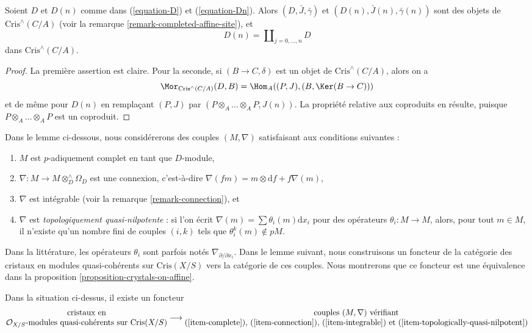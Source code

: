 \begin{lemma}
\label{lemma-property-Dn}
Soient $D$ et $D(n)$ comme dans (\ref{equation-D}) et (\ref{equation-Dn}).
Alors $(D, \bar J, \bar\gamma)$ et $(D(n), \bar J(n), \bar\gamma(n))$
sont des objets de $\text{Cris}^\wedge(C/A)$ (voir la
remarque \ref{remark-completed-affine-site}), et
$$
D(n) = \coprod\nolimits_{j = 0, \ldots, n} D
$$
dans $\text{Cris}^\wedge(C/A)$.
\end{lemma}

\begin{proof}
La première assertion est claire. Pour la seconde, si $(B \to C, \delta)$ est un
objet de $\text{Cris}^\wedge(C/A)$, alors on a
$$
\Mor_{\text{Cris}^\wedge(C/A)}(D, B) = 
\Hom_A((P, J), (B, \Ker(B \to C)))
$$
et de même pour $D(n)$ en remplaçant $(P, J)$ par
$(P \otimes_A \ldots \otimes_A P, J(n))$. La propriété relative aux coproduits en résulte,
puisque $P \otimes_A \ldots \otimes_A P$ est un coproduit.
\end{proof}

\noindent
Dans le lemme ci-dessous, nous considérerons des couples $(M, \nabla)$ satisfaisant aux
conditions suivantes :
\begin{enumerate}
\item
\label{item-complete}
$M$ est $p$-adiquement complet en tant que $D$-module,
\item
\label{item-connection}
$\nabla : M \to M \otimes^\wedge_D \Omega_D$ est une connexion, c'est-à-dire
$\nabla(fm) = m \otimes \text{d}f + f\nabla(m)$,
\item
\label{item-integrable}
$\nabla$ est intégrable
(voir la remarque \ref{remark-connection}), et
\item
\label{item-topologically-quasi-nilpotent}
$\nabla$ est {\it topologiquement quasi-nilpotente} : si l'on écrit
$\nabla(m) = \sum \theta_i(m)\text{d}x_i$ pour des opérateurs
$\theta_i : M \to M$, alors, pour tout $m \in M$, il n'existe qu'un nombre fini
de couples $(i, k)$ tels que $\theta_i^k(m) \not \in pM$.
\end{enumerate}
Dans la littérature, les opérateurs $\theta_i$ sont parfois notés
$\nabla_{\partial/\partial x_i}$.
Dans le lemme suivant, nous construisons un foncteur de la catégorie des cristaux en modules
quasi-cohérents sur $\text{Cris}(X/S)$ vers la catégorie de ces couples. Nous montrerons que
ce foncteur est une équivalence dans la
proposition \ref{proposition-crystals-on-affine}.

\begin{lemma}
\label{lemma-crystals-on-affine}
Dans la situation ci-dessus, il existe un foncteur
$$
\begin{matrix}
\text{cristaux en} \\
\mathcal{O}_{X/S}\text{-modules quasi-cohérents sur }\text{Cris}(X/S)
\end{matrix}
\longrightarrow
\begin{matrix}
\text{couples }(M, \nabla)\text{ vérifiant} \\
\text{(\ref{item-complete}), (\ref{item-connection}),
(\ref{item-integrable}) et (\ref{item-topologically-quasi-nilpotent})}
\end{matrix}
$$
\end{lemma}

